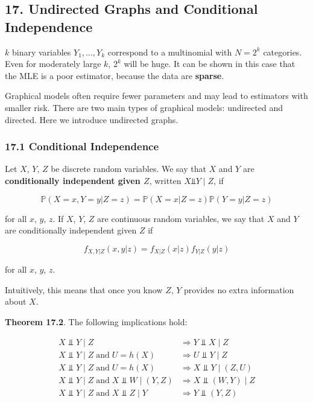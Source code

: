 \subsection{17. Undirected Graphs and Conditional Independence}\label{undirected-graphs-and-conditional-independence}

\(k\) binary variables \(Y_1, \dots, Y_k\) correspond to a multinomial
with \(N = 2^k\) categories. Even for moderately large \(k\), \(2^k\)
will be huge. It can be shown in this case that the MLE is a poor
estimator, because the data are \textbf{sparse}.

Graphical models often require fewer parameters and may lead to
estimators with smaller risk. There are two main types of graphical
models: undirected and directed. Here we introduce undirected graphs.

\subsubsection{17.1 Conditional Independence}\label{conditional-independence}

Let \(X\), \(Y\), \(Z\) be discrete random variables. We say that \(X\)
and \(Y\) are \textbf{conditionally independent given \(Z\)}, written
\(X \text{⫫} Y \;|\; Z\), if

\[ \mathbb{P}(X = x, Y = y | Z = z) = \mathbb{P}(X = x | Z = z) \mathbb{P}(Y = y | Z = z)\]

for all \(x\), \(y\), \(z\). If \(X\), \(Y\), \(Z\) are continuous
random variables, we say that \(X\) and \(Y\) are conditionally
independent given \(Z\) if

\[ f_{X, Y | Z}(x, y | z) = f_{X | Z}(x | z) f_{Y | Z}(y | z) \]

for all \(x\), \(y\), \(z\).

Intuitively, this means that once you know \(Z\), \(Y\) provides no
extra information about \(X\).

\textbf{Theorem 17.2}. The following implications hold:

\[
\begin{align}
X \text{ ⫫ } Y \;|\; Z & \Longrightarrow Y \text{ ⫫ } X \;|\; Z \\
X \text{ ⫫ } Y \;|\; Z \; \text{and} \; U = h(X) & \Longrightarrow U \text{ ⫫ } Y \;|\; Z \\
X \text{ ⫫ } Y \;|\; Z \; \text{and} \; U = h(X) & \Longrightarrow X \text{ ⫫ } Y \;|\; (Z, U)  \\
X \text{ ⫫ } Y \;|\; Z \; \text{and} \; X \text{ ⫫ } W \;|\; (Y, Z) & \Longrightarrow X \text{ ⫫ } (W, Y) \;|\; Z \\
X \text{ ⫫ } Y \;|\; Z \; \text{and} \; X \text{ ⫫ } Z \;|\; Y \; & \Longrightarrow Y \text{ ⫫ } (Y, Z)
\end{align}
\]

